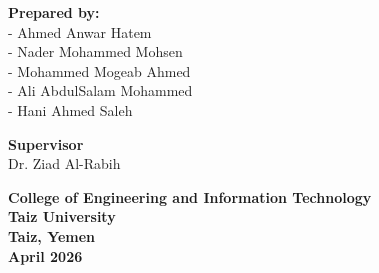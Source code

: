 \begin{titlepage}
\begin{center}
        \textbf{\normalsize Prepared by:} \\[0.3cm]
        \normalsize - Ahmed Anwar Hatem \\[0.1cm]
        \normalsize - Nader Mohammed Mohsen \\[0.1cm]
        \normalsize - Mohammed Mogeab Ahmed \\[0.1cm]
        \normalsize - Ali AbdulSalam Mohammed \\[0.1cm]
        \normalsize - Hani Ahmed Saleh
        
        \vspace{0.6cm}
        
        \textbf{\normalsize Supervisor} \\[0.3cm]
        \normalsize Dr. Ziad Al-Rabih
        
        \vfill
        
        \textbf{\normalsize College of Engineering and Information Technology} \\[0.2cm]
        \textbf{\normalsize Taiz University} \\[0.2cm]
        \textbf{\normalsize Taiz, Yemen} \\[0.2cm]
        \textbf{\normalsize April 2026}
    \end{center}

\end{titlepage}
